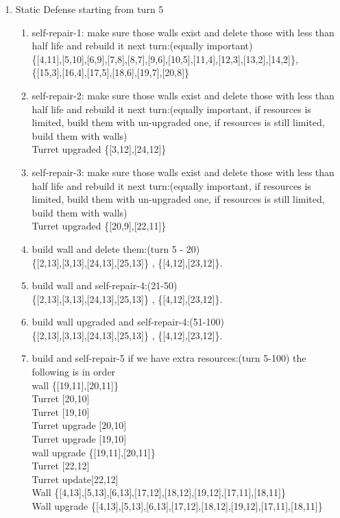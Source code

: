 \documentclass[12pt]{article}
\begin{document}
\begin{enumerate}
     \item Static Defense starting from turn 5
\begin{enumerate}
\item self-repair-1: make sure those walls exist and delete those with less than half life and rebuild it next turn:(equally important)\\ \{[4,11],[5,10],[6,9],[7,8],[8,7],[9,6],[10,5],[11,4],[12,3],[13,2],[14,2]\},\\\{[15,3],[16,4],[17,5],[18,6],[19,7],[20,8]\}
\item self-repair-2: make sure those walls exist and delete those with less than half life and rebuild it next turn:(equally important, if resources is limited, build them with un-upgraded one, if resources is still limited, build them with walls)\\ Turret upgraded \{[3,12],[24,12]\}
\item self-repair-3: make sure those walls exist and delete those with less than half life and rebuild it next turn:(equally important, if resources is limited, build them with un-upgraded one, if resources is still limited, build them with walls)\\ Turret upgraded \{[20,9],[22,11]\}
\item build wall and delete them:(turn 5 - 20)\\ \{[2,13],[3,13],[24,13],[25,13]\} , \{[4,12],[23,12]\}.
\item build wall and self-repair-4:(21-50)\\ \{[2,13],[3,13],[24,13],[25,13]\} , \{[4,12],[23,12]\}.
\item build wall upgraded and self-repair-4:(51-100)\\ \{[2,13],[3,13],[24,13],[25,13]\} , \{[4,12],[23,12]\}.
\item build and self-repair-5 if we have extra resources:(turn 5-100) the following is in order\\ wall \{[19,11],[20,11]\}\\ Turret [20,10] \\ Turret [19,10] \\ Turret upgrade [20,10] \\ Turret upgrade [19,10] \\ wall upgrade \{[19,11],[20,11]\}\\ Turret [22,12]\\ Turret update[22,12]\\ Wall \{[4,13],[5,13],[6,13],[17,12],[18,12],[19,12],[17,11],[18,11]\}\\ Wall upgrade \{[4,13],[5,13],[6,13],[17,12],[18,12],[19,12],[17,11],[18,11]\}\

\end{enumerate}
\end{enumerate}
\end{document}
